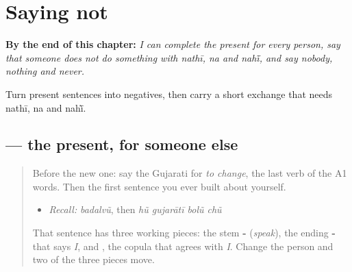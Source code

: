 
\chapter{Saying not}
\label{ch:gu-saying-not}

\begin{chapteropening}
\textbf{By the end of this chapter:} \emph{I can complete the present for every person, say that someone does not do something with nathī, na and nahī̃, and say nobody, nothing and never.}

Turn present sentences into negatives, then carry a short exchange that needs nathī, na and nahī̃.
\end{chapteropening}

\section[\texorpdfstring{\gu{તે} … \gu{બોલે} \gu{છે} (te … bole che)}{તે … બોલે છે (te … bole che)}]{    — the present, for someone else}

\label{lesson:GU-C145-bole-che}



\begin{quote}
Before the new one: say the Gujarati for \emph{to change}, the last verb of the A1 words. Then the first sentence you ever built about yourself.

\begin{itemize}
\raggedright
  \item \emph{Recall:} \emph{badalvũ}, then \emph{hũ gujarātī bolũ chũ}
\end{itemize}

That sentence has three working pieces: the stem \textbf{-} (\emph{speak}), the ending \textbf{-} that says \emph{I}, and \textbf{}, the copula that agrees with \emph{I}. Change the person and two of the three pieces move.
\end{quote}

